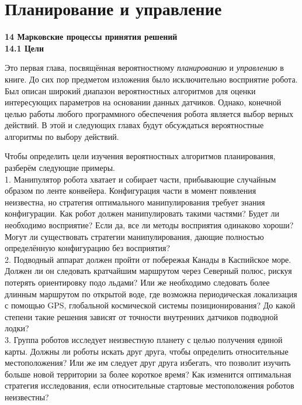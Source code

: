 \documentclass[10pt,a4paper]{article}
\begin{document}
\part{Планирование и управление}

\textbf{14	Марковские процессы принятия решений}\\

\textbf{14.1	Цели}

Это первая глава, посвящённая вероятностному \textit{планированию} и \textit{управлению} в книге. До сих пор предметом изложения было исключительно восприятие робота. Был описан широкий диапазон вероятностных алгоритмов для оценки интересующих параметров на основании данных датчиков. Однако, конечной целью работы любого программного обеспечения робота является выбор верных действий. В этой и следующих главах будут обсуждаться вероятностные алгоритмы по выбору действий.

Чтобы определить цели изучения вероятностных алгоритмов планирования, разберём следующие примеры.\\

1.	Манипулятор робота хватает и собирает части, прибывающие случайным образом по ленте конвейера. Конфигурация части в момент появления неизвестна, но стратегия оптимального манипулирования требует знания конфигурации. Как робот должен манипулировать такими частями? Будет ли необходимо восприятие? Если да, все ли методы восприятия одинаково хороши? Могут ли существовать стратегии манипулирования, дающие полностью определённую конфигурацию без восприятия?\\

2.	Подводный аппарат должен пройти от побережья Канады в Каспийское море. Должен ли он следовать кратчайшим маршрутом через Северный полюс, рискуя потерять ориентировку подо льдами? Или же необходимо следовать более длинным маршрутом по открытой воде, где возможна периодическая локализация с помощью GPS, глобальной космической системы позиционирования? До какой степени такие решения зависят от точности внутренних датчиков подводной лодки?\\

3.	Группа роботов исследует неизвестную планету с целью получения единой карты. Должны ли роботы искать друг друга, чтобы определить относительные местоположения? Или же им следует друг друга избегать, что позволит изучить больше новой территории за более короткое время? Как изменится оптимальная стратегия исследования, если относительные стартовые местоположения роботов неизвестны?\\
\end{document}
